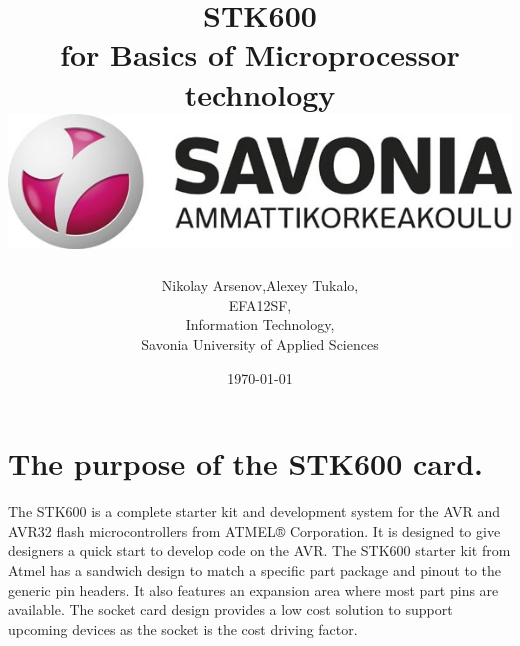 \documentclass[english]{article}
\date{}
\begin{document}
\title{\vspace{2in}STK600\\
\small for Basics of Microprocessor technology\\
\vspace{0.5in}\includegraphics{savonia.jpg}}

\nopagebreak
\maketitle


\vspace{3in}

\author{
\begin{flushright}
Nikolay Arsenov,Alexey Tukalo,\\
EFA12SF,\\
Information Technology,\\
Savonia University of Applied Sciences
\end{flushright}
}

\date{\today}
\thispagestyle{empty}

\newpage
\setcounter{page}{1}
\setcounter{tocdepth}{2}
\tableofcontents

\newpage


\section{The purpose of the STK600 card.}
The STK600 is a complete starter kit and development system for the AVR and AVR32 flash microcontrollers from ATMEL® Corporation. It is designed to give designers a quick start to develop code on the AVR. The STK600 starter kit from Atmel has a sandwich design to match a specific part package and pinout to the generic pin headers. It also features an expansion area where most part pins are available. The socket card design provides a low cost solution to support upcoming devices as the socket is the cost driving factor. 
\end{document}
